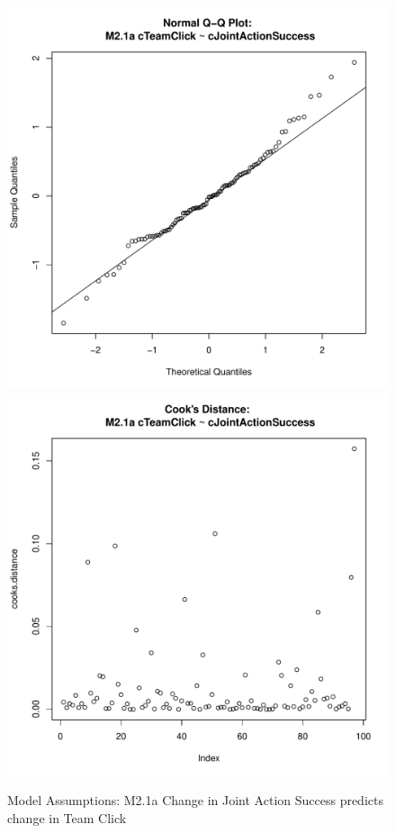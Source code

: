 {\begin{figure}[htbp]
  \includegraphics[scale =.4]{images/MLM21aQQNorm.pdf}
  \includegraphics[scale =.4]{images/MLM21aCooksD.pdf}
  \caption{Model Assumptions: M2.1a Change in Joint Action Success predicts change in Team Click}
  \label{fig:MLM21aAssumptions}
\end{figure}





}
